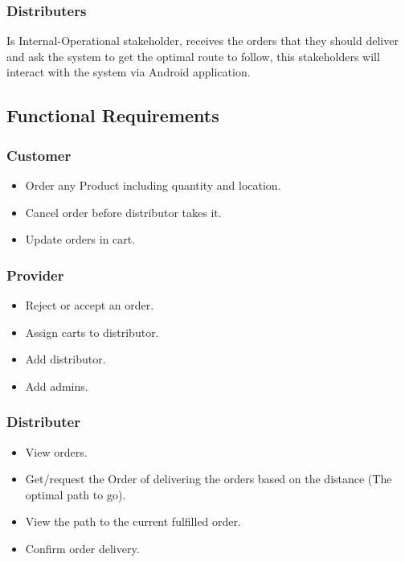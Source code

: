 \documentclass[12pt]{article}
\begin{document}
\subsubsection{  Distributers }
Is Internal-Operational stakeholder, receives the orders that they should deliver and ask the system to get the optimal route to follow, this stakeholders will interact with the system via Android application.
\newpage

\subsection{ Functional Requirements }

\subsubsection{ Customer }
\begin{itemize}
	\item Order any Product including quantity and location.
	\item Cancel order before distributor takes it.
	\item Update orders in cart.
\end{itemize}

\subsubsection{ Provider }
\begin{itemize}
	\item Reject or accept an order.
	\item Assign carts to distributor.
	\item Add distributor.
	\item Add admins.
\end{itemize}

\subsubsection{ Distributer }
\begin{itemize}
	\item View orders.
	\item Get/request the Order of delivering the orders based on the distance (The optimal path to go).
	\item View the path to the current fulfilled order.
	\item Confirm order delivery.
\end{itemize}
\newpage
\end{document}
